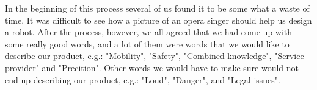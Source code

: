 In the beginning of this process several of us found it to be some what a waste of time. It was difficult to see how a picture of an opera singer should help us design a robot. After the process, however, we all agreed that we had come up with some really good words, and a lot of them were words that we would like to describe our product, e.g.: "Mobility", "Safety", "Combined knowledge", "Service provider" and "Precition". Other words we would have to make sure would not end up describing our product, e.g.: "Loud", "Danger", and "Legal issues". 